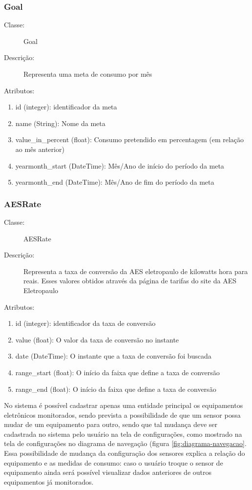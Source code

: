 \subsubsection{Goal}
\begin{description}
	\item[Classe:] Goal
	\item[Descrição:] Representa uma meta de consumo por mês
	\item[Atributos:]
\end{description} 
\begin{enumerate}
	\item id (integer): identificador da meta
	\item name (String):  Nome da meta
	\item value\_in\_percent (float): Consumo pretendido em percentagem (em relação ao mês anterior)
	\item yearmonth\_start (DateTime): Mês/Ano de início do período da meta
    \item yearmonth\_end (DateTime): Mês/Ano de fim do período da meta
\end{enumerate}
%
\subsubsection{AESRate}
\begin{description}
	\item[Classe:] AESRate
	\item[Descrição:] Representa a taxa de conversão da AES eletropaulo de kilowatts hora para reais. Esses valores obtidos através da página de tarifas do site da AES Eletropaulo \cite{aes_site}
	\item[Atributos:]
\end{description} 
\begin{enumerate}
	\item id (integer): identificador da taxa de conversão
	\item value (float): O valor da taxa de conversão no instante
	\item date (DateTime): O instante que a taxa de conversão foi buscada
	\item range\_start (float): O início da faixa que define a taxa de conversão
    \item range\_end (float): O início da faixa que define a taxa de conversão
\end{enumerate}

No sistema é possível cadastrar apenas uma entidade principal os equipamentos eletrônicos monitorados, sendo prevista a possibilidade de que um sensor possa mudar de um equipamento para outro, sendo que tal mudança deve ser cadastrada no sistema pelo  usuário na tela de configurações, como mostrado na tela de configurações no diagrama de navegação (figura \ref{fig:diagrama-navegacao}.  Essa possibilidade de mudança da configuração dos sensores explica a relação do equipamento e as medidas de consumo: caso o usuário troque o sensor de equipamento ainda será possível visualizar dados anteriores de outros equipamentos já monitorados.

